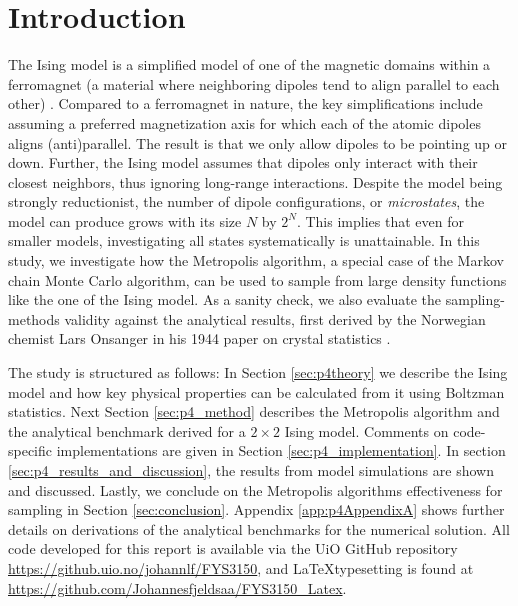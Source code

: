 \documentclass[../main_proj4_correct_template.tex]{subfiles}
\begin{document}
\section{Introduction}\label{Introduction}


The Ising model is a simplified model of one of the magnetic domains within a ferromagnet (a material where neighboring dipoles tend to align parallel to each other) \cite{thermal_physics}. Compared to a ferromagnet in nature, the key simplifications include assuming a preferred magnetization axis for which each of the atomic dipoles aligns (anti)parallel. The result is that we only allow dipoles to be pointing up or down. Further, the Ising model assumes that dipoles only interact with their closest neighbors, thus ignoring long-range interactions. Despite the model being strongly reductionist, the number of dipole configurations, or \textit{microstates}, the model can produce grows with its size $N$ by $2^{N}$. This implies that even for smaller models, investigating all states systematically is unattainable. In this study, we investigate how the Metropolis algorithm, a special case of the Markov chain Monte Carlo algorithm, can be used to sample from large density functions like the one of the Ising model. As a sanity check, we also evaluate the sampling-methods validity against the analytical results, first derived by the Norwegian chemist Lars Onsanger in his 1944 paper on crystal statistics \cite{onsanger_crystal_stat}.

The study is structured as follows: In Section \ref{sec:p4theory} we describe the Ising model and how key physical properties can be calculated from it using Boltzman statistics. Next Section \ref{sec:p4_method} describes the Metropolis algorithm and the analytical benchmark derived for a $2\times 2$ Ising model. Comments on code-specific implementations are given in Section \ref{sec:p4_implementation}. In section \ref{sec:p4_results_and_discussion}, the results from model simulations are shown and discussed. Lastly, we conclude on the Metropolis algorithms effectiveness for sampling in Section \ref{sec:conclusion}. Appendix \ref{app:p4AppendixA} shows further details on derivations of the analytical benchmarks for the numerical solution. All code developed for this report is available via the UiO GitHub repository \href{https://github.uio.no/johannlf/FYS3150}{https://github.uio.no/johannlf/FYS3150}, and \LaTeX typesetting is found at \href{https://github.com/Johannesfjeldsaa/FYS3150_Latex}{https://github.com/Johannesfjeldsaa/FYS3150\_Latex}.
\end{document}
